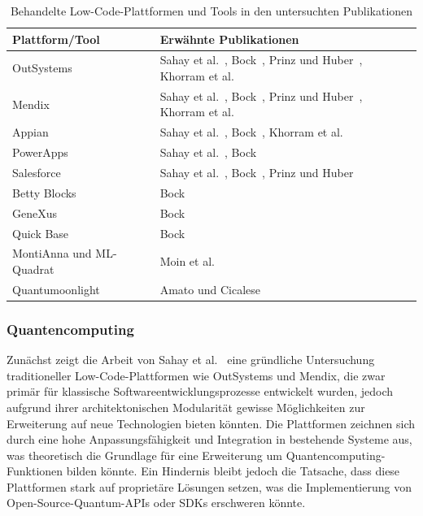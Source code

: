 \begin{table}[h]
    \centering
    \begin{tabular}{|p{5cm}|p{9cm}|}
    \hline
    \textbf{Plattform/Tool} & \textbf{Erwähnte Publikationen} \\ \hline
    OutSystems              & Sahay et al.~\cite{Sahay_2020}, Bock~\cite{Bock_2021_essence}, Prinz und Huber~\cite{Prinz_2021}, Khorram et al.~\cite{Khorram_2020} \\ \hline
    Mendix                  & Sahay et al.~\cite{Sahay_2020}, Bock~\cite{Bock_2021_essence}, Prinz und Huber~\cite{Prinz_2021}, Khorram et al.~\cite{Khorram_2020} \\ \hline
    Appian                  & Sahay et al.~\cite{Sahay_2020}, Bock~\cite{Bock_2021_essence}, Khorram et al.~\cite{Khorram_2020} \\ \hline
    PowerApps               & Sahay et al.~\cite{Sahay_2020}, Bock~\cite{Bock_2021_essence} \\ \hline
    Salesforce              & Sahay et al.~\cite{Sahay_2020}, Bock~\cite{Bock_2021_essence}, Prinz und Huber~\cite{Prinz_2021} \\ \hline
    Betty Blocks            & Bock~\cite{Bock_2021_essence} \\ \hline
    GeneXus                 & Bock~\cite{Bock_2021_essence} \\ \hline
    Quick Base              & Bock~\cite{Bock_2021_essence} \\ \hline
    MontiAnna und ML-Quadrat & Moin et al.~\cite{Moin_2023} \\ \hline
    Quantumoonlight         & Amato und Cicalese~\cite{Amato_2023} \\ \hline
    \end{tabular}
    \caption{Behandelte Low-Code-Plattformen und Tools in den untersuchten Publikationen}
    \label{tab:low-code-platforms}
\end{table}

\subsubsection{Quantencomputing}
Zunächst zeigt die Arbeit von Sahay et al.~\cite{Sahay_2020} eine gründliche Untersuchung traditioneller Low-Code-Plattformen wie 
OutSystems und Mendix, die zwar primär für klassische Softwareentwicklungsprozesse entwickelt wurden, jedoch aufgrund ihrer 
architektonischen Modularität gewisse Möglichkeiten zur Erweiterung auf neue Technologien bieten könnten. Die Plattformen 
zeichnen sich durch eine hohe Anpassungsfähigkeit und Integration in bestehende Systeme aus, was theoretisch die Grundlage 
für eine Erweiterung um Quantencomputing-Funktionen bilden könnte. Ein Hindernis bleibt jedoch die Tatsache, dass diese 
Plattformen stark auf proprietäre Lösungen setzen, was die Implementierung von Open-Source-Quantum-APIs oder SDKs erschweren könnte.

